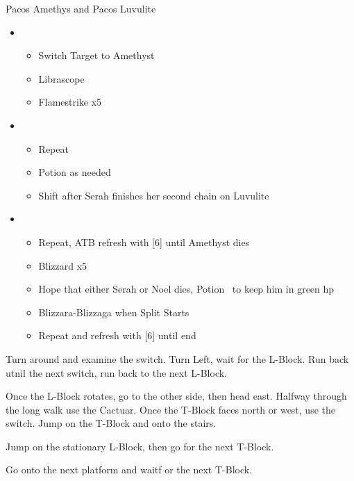 \begin{battle}{Pacos Amethys and Pacos Luvulite}
  \begin{flushleft}
    \begin{itemize}
      \item \sixth
            \begin{itemize}
              \item Switch Target to Amethyst
              \item Librascope
              \item Flamestrike x5
            \end{itemize}
      \item \third
            \begin{itemize}
              \item Repeat
              \item Potion as needed
              \item Shift after Serah finishes her second chain on Luvulite
            \end{itemize}
      \item \fifth
            \begin{itemize}
              \item Repeat, ATB refresh with [6] until Amethyst dies
              \item Blizzard x5
              \item Hope that either Serah or Noel dies, Potion \chu\ to keep him in green hp
              \item Blizzara-Blizzaga when Split Starts
              \item Repeat and refresh with [6] until end
            \end{itemize}
    \end{itemize}
  \end{flushleft}
\end{battle}

Turn around and examine the switch. Turn Left, wait for the L-Block. Run back utnil the next switch, run back to the next L-Block. 

Once the L-Block rotates, go to the other side, then head east. Halfway through the long walk use the Cactuar. Once the T-Block faces north or west, use the switch. Jump on the T-Block and onto the stairs.

Jump on the stationary L-Block, then go for the next T-Block.

Go onto the next platform and waitf or the next T-Block. 

